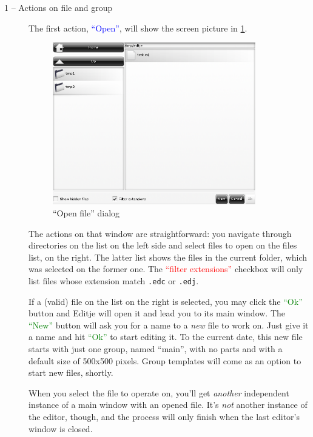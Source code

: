 \documentclass[a4paper]{profusion}
\newcommand{\GUICheckbox}[1]{\textcolor{red}{#1}}
\newcommand{\GUIButton}[1]{\textcolor{green}{#1}} %
\newcommand{\GUIIcon}[1]{\textcolor{blue}{#1}}    %
\begin{document}
\begin{description}
\item[1 -- Actions on file and group] The first action,
  \GUIIcon{``Open''}, will show the screen picture in \ref{fig:open_file}.
  \begin{figure}[h!]
    \centering
    \includegraphics[width=0.87\textwidth]{images/open_file.png}
    \caption{``Open file'' dialog}
    \label{fig:open_file}
  \end{figure}
  The actions on that window are straightforward: you navigate through
  directories on the list on the left side and select files to open on
  the files list, on the right. The latter list shows the files in the
  current folder, which was selected on the former one. The
  \GUICheckbox{``filter extensions''} checkbox will only list files
  whose extension match \texttt{.edc} or \texttt{.edj}.

  If a (valid) file on the list on the right is selected, you may click
  the \GUIButton{``Ok''} button and Editje will open it and lead you to
  its main window. The \GUIButton{``New''} button will ask you for a
  name to a \emph{new} file to work on. Just give it a name and hit
  \GUIButton{``Ok''} to start editing it. To the current date, this new
  file starts with just one group, named ``main'', with no parts and
  with a default size of 500x500 pixels. Group templates will come as an
  option to start new files, shortly.

  When you select the file to operate on, you'll get \emph{another}
  independent instance of a main window with an opened file. It's
  \emph{not} another instance of the editor, though, and the process
  will only finish when the last editor's window is closed.


\end{description}
\end{document}
